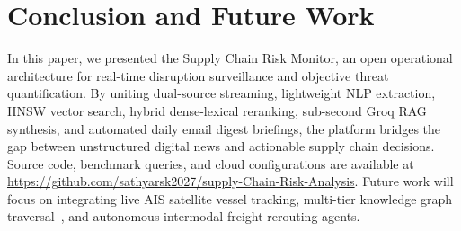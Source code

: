 \documentclass[conference]{IEEEtran}
\begin{document}
\section{Conclusion and Future Work}
In this paper, we presented the Supply Chain Risk Monitor, an open operational architecture for real-time disruption surveillance and objective threat quantification. By uniting dual-source streaming, lightweight NLP extraction, HNSW vector search, hybrid dense-lexical reranking, sub-second Groq RAG synthesis, and automated daily email digest briefings, the platform bridges the gap between unstructured digital news and actionable supply chain decisions. Source code, benchmark queries, and cloud configurations are available at \url{https://github.com/sathyarsk2027/supply-Chain-Risk-Analysis}. Future work will focus on integrating live AIS satellite vessel tracking, multi-tier knowledge graph traversal~\cite{almoslmi2020named}, and autonomous intermodal freight rerouting agents.

\balance


\end{document}
